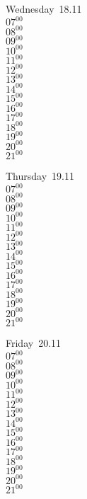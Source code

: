 \documentclass[11pt,a4paper]{book}\usepackage[]{graphicx}\usepackage[]{color}
\begin{document}
\begin{weekdaybox}
  Wednesday~18.11\\
  { 
  \vfill
  $07^{00}$\\
$08^{00}$\\
$09^{00}$\\
$10^{00}$\\
$11^{00}$\\
$12^{00}$\\
$13^{00}$\\
$14^{00}$\\
$15^{00}$\\
$16^{00}$\\
$17^{00}$\\
$18^{00}$\\
$19^{00}$\\
$20^{00}$\\
$21^{00}$\\
  }
\end{weekdaybox}
\clearpage
\begin{headerbox}
\end{headerbox}
\begin{weekdaybox}
  Thursday~19.11\\
  { 
  \vfill
  $07^{00}$\\
$08^{00}$\\
$09^{00}$\\
$10^{00}$\\
$11^{00}$\\
$12^{00}$\\
$13^{00}$\\
$14^{00}$\\
$15^{00}$\\
$16^{00}$\\
$17^{00}$\\
$18^{00}$\\
$19^{00}$\\
$20^{00}$\\
$21^{00}$\\
  }
\end{weekdaybox} 
\begin{weekdaybox}
  Friday~20.11\\
  { 
  \vfill
  $07^{00}$\\
$08^{00}$\\
$09^{00}$\\
$10^{00}$\\
$11^{00}$\\
$12^{00}$\\
$13^{00}$\\
$14^{00}$\\
$15^{00}$\\
$16^{00}$\\
$17^{00}$\\
$18^{00}$\\
$19^{00}$\\
$20^{00}$\\
$21^{00}$\\
  }
\end{weekdaybox}
\end{document}

